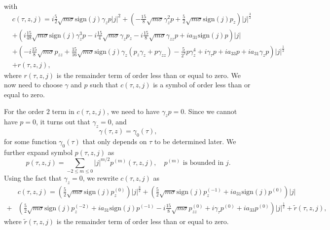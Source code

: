 \documentclass[12pt]{amsart}
\theoremstyle{remark}
\theoremstyle{definition}
\numberwithin{equation}{section}
\newcommand{\f}{\frac}
\begin{document}
with
\begin{align*}
&c(\tau,z,j)=i\f52\sqrt{m\sigma}\text{sign}(j)\gamma_z p|j|^2 +\left(-\f{15}{8}\sqrt{m\sigma}\gamma^2_zp+\f52\sqrt{m\sigma}\text{sign}(j)p_z\right)|j|^{\f32}\\
&+\left(i\f{15}{48}\sqrt{m\sigma}\text{sign}(j)\gamma_z^3p-i\f{15}{4}\sqrt{m\sigma}\gamma_zp_z-i\f{15}{8}\sqrt{m\sigma}\gamma_{zz}p+ia_{31}\text{sign}(j)p\right)|j|\\
&+\left(-i\f{15}{8}\sqrt{m\sigma}p_{zz}+\f{15}{16}\sqrt{m\sigma}\text{sign}(j)\gamma_z(p_z\gamma_z+p\gamma_{zz})-\f{5}{2^7}p\gamma_z^4
+i\gamma_{\tau}p+ia_{33}p+ia_{31}\gamma_zp\right)|j|^{\f12}\\
&+r(\tau, z, j),
\end{align*}
where $r(\tau, z, j)$ is the remainder term of order less than or equal to zero.
We now need to choose $\gamma$ and $p$ such that $c(\tau, z, j)$ is a symbol of order less than or equal to zero. 

For the order $2$ term in $c(\tau,z,j)$, we need to have $\gamma_z p =0$.
Since we cannot have $p = 0$, it turns out that $\gamma_z = 0$, and
\begin{equation*}
    \gamma(\tau, z) = \gamma_0(\tau),
\end{equation*}
for some function $\gamma_0(\tau)$ that only depends on $\tau$ to be determined later.
We further expand symbol $p(\tau, z, j )$ as
\begin{equation*}
    p(\tau, z, j ) = \sum_{-2 \leq m \leq 0}|j|^{m/2}p^{(m)}(\tau, z, j ), \quad p^{(m)}\text{ is bounded in } j.
\end{equation*}
Using the fact that $\gamma_z = 0$, we rewrite $c(\tau, z, j)$ as
\begin{align*}
 &c(\tau, z, j) =   \left(\f52\sqrt{m\sigma}\text{sign}(j)p_z^{(0)}\right)|j|^{\f32} + \left(\f52\sqrt{m\sigma}\text{sign}(j)p_z^{(-1)} +ia_{31}\text{sign}(j)p^{(0)}\right)|j| \\
 +&  \left(\f52\sqrt{m\sigma}\text{sign}(j)p_z^{(-2)} +ia_{31}\text{sign}(j)p^{(-1)} -i\f{15}{8}\sqrt{m\sigma}p_{zz}^{(0)}+i\gamma_{\tau}p^{(0)}+ia_{33}p^{(0)}\right)|j|^{\f12} + \tilde{r}(\tau, z, j),
\end{align*}
where $\tilde{r}(\tau, z, j)$ is the remainder term of order less than or equal to zero.
\end{document}
